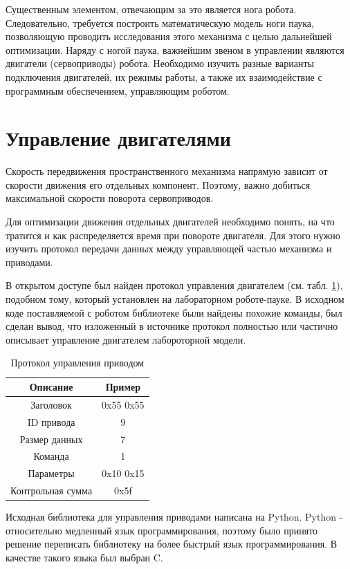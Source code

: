 \documentclass{article}
\begin{document}
Существенным элементом, отвечающим за это является нога робота. Следовательно, требуется построить математическую модель ноги паука, позволяющую проводить исследования этого механизма с целью дальнейшей оптимизации.
Наряду с ногой паука, важнейшим звеном в управлении являются двигатели (сервоприводы) робота. Необходимо изучить разные варианты подключения двигателей, их режимы работы, а также их взаимодействие с программным обеспечением, управляющим роботом.
\newpage

\section{Управление двигателями}
Скорость передвижения пространственного механизма напрямую зависит от скорости движения его отдельных компонент. Поэтому, важно добиться максимальной скорости поворота сервоприводов.

Для оптимизации движения отдельных двигателей необходимо понять, на что тратится и как распределяется время при повороте двигателя. Для этого нужно изучить протокол передачи данных между управляющей частью механизма и приводами.

В открытом доступе \cite{ref9} был найден протокол управления двигателем (см. табл. \ref{tab:protocol}), подобном тому, который установлен на лабораторном роботе-пауке. В исходном коде поставляемой с роботом библиотеке были найдены похожие команды, был сделан вывод, что изложенный в источнике протокол полностью или частично описывает управление двигателем лабороторной модели.

\begin{table}[h]
\centering
\begin{tabular}{|c|c|}
    \hline
    Описание & Пример \\
    \hline \hline
    Заголовок & 0x55 0x55 \\ \hline
    ID привода & 9 \\ \hline
    Размер данных & 7 \\ \hline
    Команда & 1 \\ \hline
    Параметры & 0x10 0x15 \\ \hline
    Контрольная сумма & 0x5f \\  \hline
\end{tabular}
\caption{Протокол управления приводом}
\label{tab:protocol}
\end{table}

Исходная библиотека для управления приводами написана на Python. Python - относительно медленный язык программирования, поэтому было принято решение переписать библиотеку на более быстрый язык программирования. В качестве такого языка был выбран C.
\end{document}
